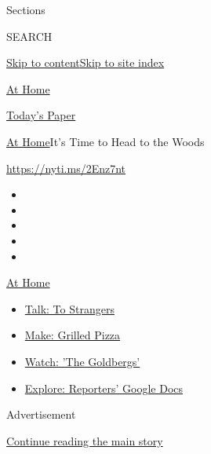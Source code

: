Sections

SEARCH

\protect\hyperlink{site-content}{Skip to
content}\protect\hyperlink{site-index}{Skip to site index}

\href{https://www.nytimes.com/spotlight/at-home}{At Home}

\href{https://myaccount.nytimes.com/auth/login?response_type=cookie\&client_id=vi}{}

\href{https://www.nytimes.com/section/todayspaper}{Today's Paper}

\href{/spotlight/at-home}{At Home}\textbar{}It's Time to Head to the
Woods

\url{https://nyti.ms/2Enz7nt}

\begin{itemize}
\item
\item
\item
\item
\item
\end{itemize}

\href{https://www.nytimes.com/spotlight/at-home?action=click\&pgtype=Article\&state=default\&region=TOP_BANNER\&context=at_home_menu}{At
Home}

\begin{itemize}
\tightlist
\item
  \href{https://www.nytimes.com/2020/08/03/well/family/the-benefits-of-talking-to-strangers.html?action=click\&pgtype=Article\&state=default\&region=TOP_BANNER\&context=at_home_menu}{Talk:
  To Strangers}
\item
  \href{https://www.nytimes.com/2020/08/01/at-home/coronavirus-make-pizza-on-a-grill.html?action=click\&pgtype=Article\&state=default\&region=TOP_BANNER\&context=at_home_menu}{Make:
  Grilled Pizza}
\item
  \href{https://www.nytimes.com/2020/07/31/arts/television/goldbergs-abc-stream.html?action=click\&pgtype=Article\&state=default\&region=TOP_BANNER\&context=at_home_menu}{Watch:
  'The Goldbergs'}
\item
  \href{https://www.nytimes.com/interactive/2020/at-home/even-more-reporters-editors-diaries-lists-recommendations.html?action=click\&pgtype=Article\&state=default\&region=TOP_BANNER\&context=at_home_menu}{Explore:
  Reporters' Google Docs}
\end{itemize}

Advertisement

\protect\hyperlink{after-top}{Continue reading the main story}

